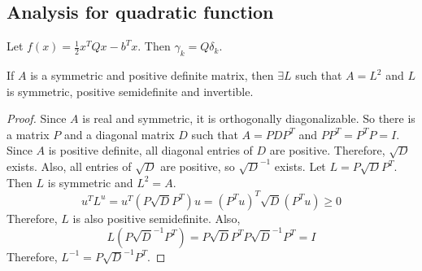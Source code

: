\subsection{Analysis for quadratic function}

Let $f(x) = \frac{1}{2}x^TQx - b^Tx$. Then $\gamma_k = Q\delta_k$.

\begin{lemma}
If $A$ is a symmetric and positive definite matrix,
then $\exists L$ such that $A = L^2$ and $L$ is symmetric, positive semidefinite and invertible.
\end{lemma}
\begin{proof}
Since $A$ is real and symmetric, it is orthogonally diagonalizable.
So there is a matrix $P$ and a diagonal matrix $D$ such that $A = PDP^T$ and $PP^T = P^TP = I$.
Since $A$ is positive definite, all diagonal entries of $D$ are positive.
Therefore, $\sqrt{D}$ exists.
Also, all entries of $\sqrt{D}$ are positive, so $\sqrt{D}^{-1}$ exists.
Let $L = P\sqrt{D}P^T$. Then $L$ is symmetric and $L^2 = A$.
\[ u^TL^u = u^T(P\sqrt{D}P^T)u = (P^Tu)^T\sqrt{D}(P^Tu) \ge 0 \]
Therefore, $L$ is also positive semidefinite. Also,
\[ L(P\sqrt{D}^{-1}P^T) = P\sqrt{D}P^TP\sqrt{D}^{-1}P^T = I \]
Therefore, $L^{-1} = P\sqrt{D}^{-1}P^T$.
\end{proof}

